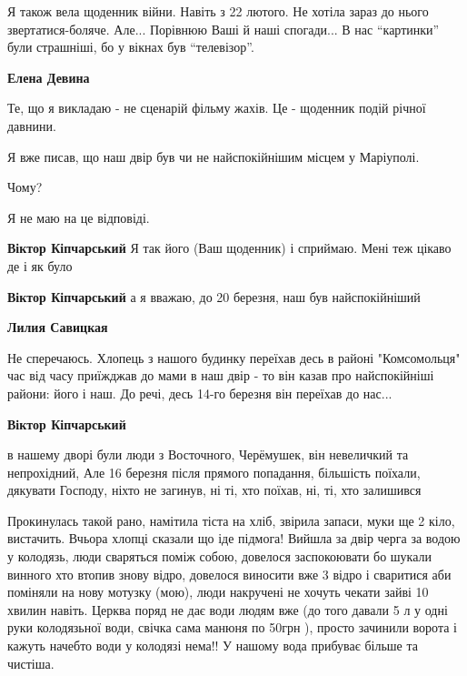  
 
 
 
 

\qqSecCmt


Я також вела щоденник війни. Навіть з 22 лютого. Не хотіла зараз до нього
звертатися-боляче. Але... Порівнюю Ваші й наші спогади... В нас \enquote{картинки} були
страшніші, бо у вікнах був \enquote{телевізор}.

\begin{itemize} %
\textbf{Елена Девина} 

Те, що я викладаю - не сценарій фільму жахів. Це - щоденник подій річної давнини.

Я вже писав, що наш двір був чи не найспокійнішим місцем у Маріуполі.

Чому?

Я не маю на це відповіді.

\textbf{Віктор Кіпчарський} Я так його (Ваш щоденник) і сприймаю. Мені теж цікаво де і як було

\textbf{Віктор Кіпчарський} а я вважаю, до 20 березня, наш був найспокійніший

\textbf{Лилия Савицкая} 

Не сперечаюсь. Хлопець з нашого будинку переїхав десь в районі "Комсомольця"
час від часу приїжджав до мами в наш двір - то він казав про найспокійніші
райони: його і наш. До речі, десь 14-го березня він переїхав до нас...

\textbf{Віктор Кіпчарський} 

в нашему дворі були люди з Восточного, Черёмушек, він невеличкий та
непрохідний, Але 16 березня після прямого попадання, більшість поїхали,
дякувати Господу, ніхто не загинув, ні ті, хто поїхав, ні, ті, хто залишився

\end{itemize} %



Прокинулась такой рано, намітила тіста на хліб, звірила запаси, муки ще 2 кіло,
вистачить. Вчьора хлопці сказали що іде підмога! Вийшла за двір черга за водою
у колодязь, люди сваряться поміж собою, довелося заспокоювати бо шукали винного
хто втопив знову відро, довелося виносити вже 3 відро і сваритися аби поміняли
на нову мотузку (мою), люди накручені не хочуть чекати зайві 10 хвилин навіть.
Церква поряд не дає води людям вже (до того давали 5 л у одні руки колодязьної
води, свічка сама манюня по 50грн ), просто зачинили ворота і кажуть начебто
води у колодязі нема!! У нашому вода прибуває більше та чистіша.

